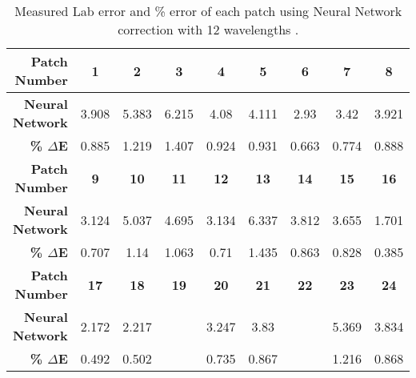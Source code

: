 \begin{table}[H]
  \caption{Measured Lab error and \% error of each patch using Neural Network correction with 12 wavelengths .}\n  \begin{center}
    \begin{tabularx}{\textwidth}{r c c c c c c c c}
    \toprule
        \textbf{Patch Number} & \textbf{1} & \textbf{2} & \textbf{3} & \textbf{4} & \textbf{5} & \textbf{6} & \textbf{7} & \textbf{8}\\ \midrule 
        \textbf{Neural Network} &3.908 &5.383 &6.215 &4.08 &4.111 &2.93 &3.42 &3.921\\ 
        \textbf{\textbf{\% $\Delta$E}} &0.885 &1.219 &1.407 &0.924 &0.931 &0.663 &0.774 &0.888\\ \midrule 
        \textbf{Patch Number} & \textbf{9} & \textbf{10} & \textbf{11} & \textbf{12} & \textbf{13} & \textbf{14} & \textbf{15} & \textbf{16}\\ \midrule 
        \textbf{Neural Network} &3.124 &5.037 &4.695 &3.134 &6.337 &3.812 &3.655 &1.701\\ 
        \textbf{\textbf{\% $\Delta$E}} &0.707 &1.14 &1.063 &0.71 &1.435 &0.863 &0.828 &0.385\\ \midrule 
        \textbf{Patch Number} & \textbf{17} & \textbf{18} & \textbf{19} & \textbf{20} & \textbf{21} & \textbf{22} & \textbf{23} & \textbf{24}\\ \midrule 
        \textbf{Neural Network} &2.172 &2.217 &\cellcolor{colorgreen}{1.098} &3.247 &3.83 &\cellcolor{colorred}{6.565} &5.369 &3.834\\ 
        \textbf{\textbf{\% $\Delta$E}} &0.492 &0.502 &\cellcolor{colorgreen}{0.249} &0.735 &0.867 &\cellcolor{colorred}{1.486} &1.216 &0.868\\ \midrule 
    \bottomrule
    \end{tabularx}
  \end{center}
\end{table}
